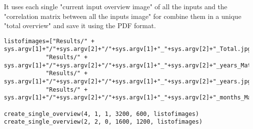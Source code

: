It uses each single "current input overview image" of all the inputs and the "correlation matrix between all the inputs image" for combine them in a unique "total overview" and save it using the PDF format.

\begin{lstlisting}
listofimages=["Results/" + sys.argv[1]+"/"+sys.argv[2]+"/"+sys.argv[1]+"_"+sys.argv[2]+"_Total.jpg",
            "Results/" + sys.argv[1]+"/"+sys.argv[2]+"/"+sys.argv[1]+"_"+sys.argv[2]+"_years_Matrix.jpg", 
            "Results/" + sys.argv[1]+"/"+sys.argv[2]+"/"+sys.argv[1]+"_"+sys.argv[2]+"_years.jpg",
            "Results/" + sys.argv[1]+"/"+sys.argv[2]+"/"+sys.argv[1]+"_"+sys.argv[2]+"_months_Matrix.jpg"]

create_single_overview(4, 1, 1, 3200, 600, listofimages)
create_single_overview(2, 2, 0, 1600, 1200, listofimages)
\end{lstlisting}

